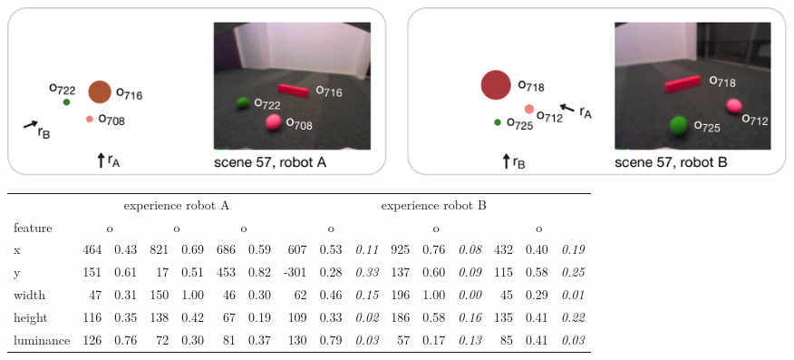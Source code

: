 \parbox{\textwidth}{\footnotesize\sffamily 
  \includegraphics[width=1\textwidth]{figures/vision-system-example-scene}
  \vspace{1mm}
  
  \renewcommand{\arraystretch}{1.5}
  \newcommand{\sub}[1]{\raisebox{-2pt}{\scriptsize{#1}}}
  \addtolength{\tabcolsep}{-1.3pt}
  \begin{tabular*}{\textwidth}{@{}p{26.5mm}|rl|rl|rl||rll|rll|rll@{}}
    & \multicolumn{6}{c||}{experience robot A} & \multicolumn{9}{c}{experience robot B} \\
    feature \normalsize & 
    \multicolumn{2}{c}{o\sub{708}} & 
    \multicolumn{2}{c}{o\sub{716}} &
    \multicolumn{2}{c||}{o\sub{722}} & 
    \multicolumn{3}{c}{o\sub{712}} & 
    \multicolumn{3}{c}{o\sub{718}} & 
    \multicolumn{3}{c}{o\sub{725}} \\
    \hline
    x & 464 & 0.43 & 821 & 0.69 & 686 & 0.59
    & 607 & 0.53 & \itshape\textcolor{dark}{0.11}
    & 925 & 0.76 & \itshape\textcolor{dark}{0.08}
    & 432 & 0.40 & \itshape\textcolor{dark}{0.19} \\
    y & 151 & 0.61 & 17 & 0.51 & 453 & 0.82
    & -301 & 0.28 & \itshape\textcolor{dark}{0.33}
    & 137 & 0.60 & \itshape\textcolor{dark}{0.09}
    & 115 & 0.58 & \itshape\textcolor{dark}{0.25} \\
    width & 47 & 0.31 & 150 & 1.00 & 46 & 0.30
    & 62 & 0.46 & \itshape\textcolor{dark}{0.15}
    & 196 & 1.00 & \itshape\textcolor{dark}{0.00}
    & 45 & 0.29 & \itshape\textcolor{dark}{0.01} \\
    height & 116 & 0.35 & 138 & 0.42 & 67 & 0.19
    & 109 & 0.33 & \itshape\textcolor{dark}{0.02}
    & 186 & 0.58 & \itshape\textcolor{dark}{0.16}
    & 135 & 0.41 & \itshape\textcolor{dark}{0.22} \\
    luminance & 126 & 0.76 & 72 & 0.30 & 81 & 0.37
    & 130 & 0.79 & \itshape\textcolor{dark}{0.03}
    & 57 & 0.17 & \itshape\textcolor{dark}{0.13}
    & 85 & 0.41 & \itshape\textcolor{dark}{0.03} \\

\end{tabular*}}
